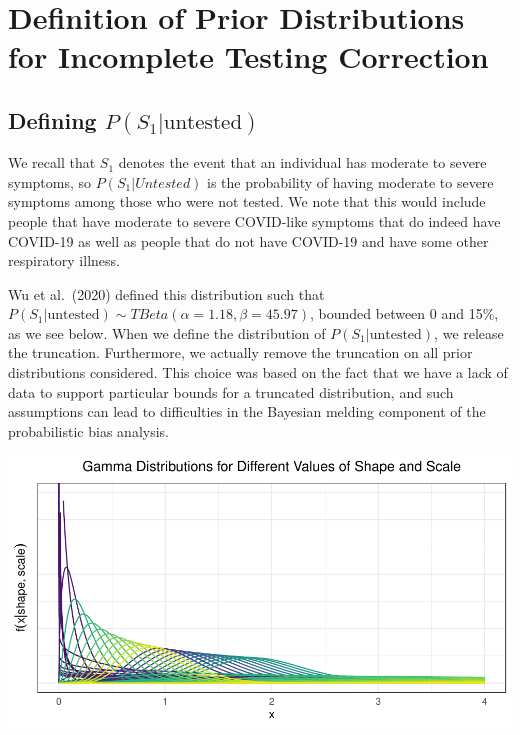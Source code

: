 \documentclass[12pt,twoside]{smiththesis}
\begin{document}
\hypertarget{definition-of-prior-distributions-for-incomplete-testing-correction}{%
\section{Definition of Prior Distributions for Incomplete Testing Correction}\label{definition-of-prior-distributions-for-incomplete-testing-correction}}

\hypertarget{defining-ps_1textuntested}{%
\subsection{\texorpdfstring{Defining \(P(S_1|\text{untested})\)}{Defining P(S\_1\textbar\textbackslash text\{untested\})}}\label{defining-ps_1textuntested}}

We recall that \(S_1\) denotes the event that an individual has moderate to severe symptoms, so
\(P(S_1|Untested)\) is the probability of having moderate to severe symptoms among those who were not tested. We note that this would include people that have moderate to severe COVID-like symptoms that do indeed have COVID-19 as well as people that do not have COVID-19 and have some other respiratory illness.

Wu et al.~(2020) defined this distribution such that \(P(S_1|\text{untested}) \sim TBeta(\alpha = 1.18, \beta = 45.97)\), bounded between 0 and 15\%, as we see below. When we define the distribution of \(P(S_1|\text{untested})\), we release the truncation. Furthermore, we actually remove the truncation on all prior distributions considered. This choice was based on the fact that we have a lack of data to support particular bounds for a truncated distribution, and such assumptions can lead to difficulties in the Bayesian melding component of the probabilistic bias analysis.
\begin{center}\includegraphics[width=1\linewidth]{thesis_files/figure-latex/unnamed-chunk-52-1} \end{center}
\end{document}

